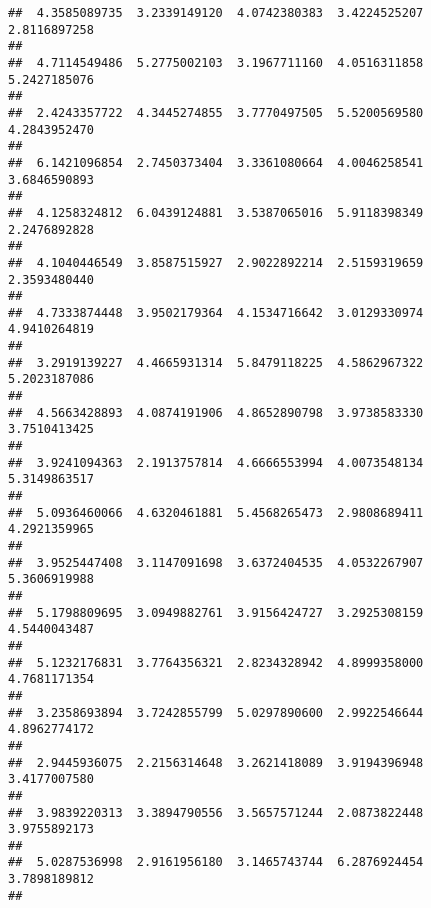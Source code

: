 \documentclass[]{article}
\begin{document}
\begin{verbatim}
##  4.3585089735  3.2339149120  4.0742380383  3.4224525207  2.8116897258 
##                                                                       
##  4.7114549486  5.2775002103  3.1967711160  4.0516311858  5.2427185076 
##                                                                       
##  2.4243357722  4.3445274855  3.7770497505  5.5200569580  4.2843952470 
##                                                                       
##  6.1421096854  2.7450373404  3.3361080664  4.0046258541  3.6846590893 
##                                                                       
##  4.1258324812  6.0439124881  3.5387065016  5.9118398349  2.2476892828 
##                                                                       
##  4.1040446549  3.8587515927  2.9022892214  2.5159319659  2.3593480440 
##                                                                       
##  4.7333874448  3.9502179364  4.1534716642  3.0129330974  4.9410264819 
##                                                                       
##  3.2919139227  4.4665931314  5.8479118225  4.5862967322  5.2023187086 
##                                                                       
##  4.5663428893  4.0874191906  4.8652890798  3.9738583330  3.7510413425 
##                                                                       
##  3.9241094363  2.1913757814  4.6666553994  4.0073548134  5.3149863517 
##                                                                       
##  5.0936460066  4.6320461881  5.4568265473  2.9808689411  4.2921359965 
##                                                                       
##  3.9525447408  3.1147091698  3.6372404535  4.0532267907  5.3606919988 
##                                                                       
##  5.1798809695  3.0949882761  3.9156424727  3.2925308159  4.5440043487 
##                                                                       
##  5.1232176831  3.7764356321  2.8234328942  4.8999358000  4.7681171354 
##                                                                       
##  3.2358693894  3.7242855799  5.0297890600  2.9922546644  4.8962774172 
##                                                                       
##  2.9445936075  2.2156314648  3.2621418089  3.9194396948  3.4177007580 
##                                                                       
##  3.9839220313  3.3894790556  3.5657571244  2.0873822448  3.9755892173 
##                                                                       
##  5.0287536998  2.9161956180  3.1465743744  6.2876924454  3.7898189812 
##                                                                       

\end{verbatim}
\end{document}
